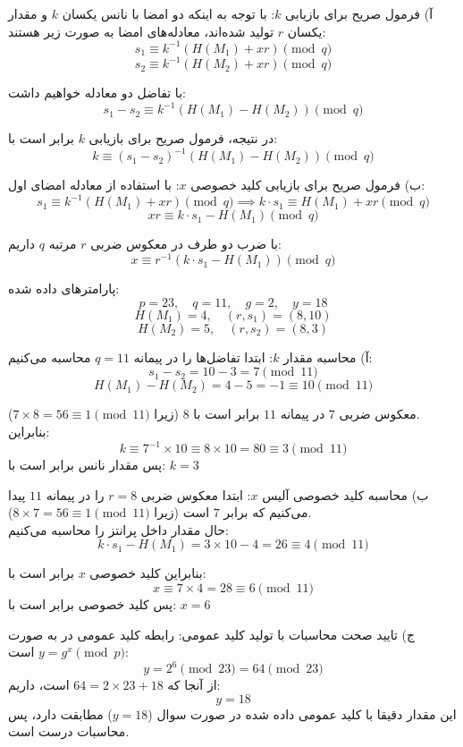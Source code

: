 
{آ) فرمول صریح برای بازیابی $k$:}
با توجه به اینکه دو امضا با نانس یکسان $k$ و مقدار یکسان $r$ تولید شده‌اند، معادله‌های امضا به صورت زیر هستند:
\[ s_1 \equiv k^{-1}(H(M_1) + xr) \pmod q \]
\[ s_2 \equiv k^{-1}(H(M_2) + xr) \pmod q \]

با تفاضل دو معادله خواهیم داشت:
\[ s_1 - s_2 \equiv k^{-1}(H(M_1) - H(M_2)) \pmod q \]

در نتیجه، فرمول صریح برای بازیابی $k$ برابر است با:
\[ k \equiv (s_1 - s_2)^{-1}(H(M_1) - H(M_2)) \pmod q \]

{ب) فرمول صریح برای بازیابی کلید خصوصی $x$:}
با استفاده از معادله امضای اول:
\[ s_1 \equiv k^{-1}(H(M_1) + xr) \pmod q \implies k \cdot s_1 \equiv H(M_1) + xr \pmod q \]
\[ xr \equiv k \cdot s_1 - H(M_1) \pmod q \]

با ضرب دو طرف در معکوس ضربی $r$ مرتبه $q$ داریم:
\[ x \equiv r^{-1}(k \cdot s_1 - H(M_1)) \pmod q \]


پارامترهای داده شده:
\[ p = 23, \quad q = 11, \quad g = 2, \quad y = 18 \]
\[ H(M_1) = 4, \quad (r, s_1) = (8, 10) \]
\[ H(M_2) = 5, \quad (r, s_2) = (8, 3) \]

{آ) محاسبه مقدار $k$:}
ابتدا تفاضل‌ها را در پیمانه $q = 11$ محاسبه می‌کنیم:
\[ s_1 - s_2 = 10 - 3 = 7 \pmod{11} \]
\[ H(M_1) - H(M_2) = 4 - 5 = -1 \equiv 10 \pmod{11} \]

معکوس ضربی $7$ در پیمانه $11$ برابر است با $8$ (زیرا $7 \times 8 = 56 \equiv 1 \pmod{11}$).\\
بنابراین:
\[ k \equiv 7^{-1} \times 10 \equiv 8 \times 10 = 80 \equiv 3 \pmod{11} \]
پس مقدار نانس برابر است با: {$k = 3$}

{ب) محاسبه کلید خصوصی آلیس $x$:}
ابتدا معکوس ضربی $r = 8$ را در پیمانه $11$ پیدا می‌کنیم که برابر $7$ است (زیرا $8 \times 7 = 56 \equiv 1 \pmod{11}$).\\
حال مقدار داخل پرانتز را محاسبه می‌کنیم:
\[ k \cdot s_1 - H(M_1) = 3 \times 10 - 4 = 26 \equiv 4 \pmod{11} \]

بنابراین کلید خصوصی $x$ برابر است با:
\[ x \equiv 7 \times 4 = 28 \equiv 6 \pmod{11} \]
پس کلید خصوصی برابر است با: \textbf{$x = 6$}

{ج) تایید صحت محاسبات با تولید کلید عمومی:}
رابطه کلید عمومی در  به صورت $y = g^x \pmod p$ است:
\[ y = 2^6 \pmod{23} = 64 \pmod{23} \]
از آنجا که $64 = 2 \times 23 + 18$ است، داریم:
\[ y = 18 \]
این مقدار دقیقا با کلید عمومی داده شده در صورت سوال ($y = 18$) مطابقت دارد، پس محاسبات درست است.

